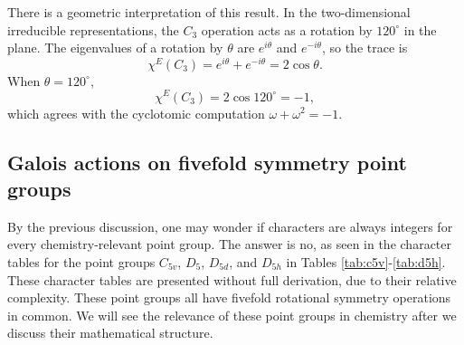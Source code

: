 \documentclass{article}
\begin{document}
    There is a geometric interpretation of this result. In the two-dimensional irreducible representations, the $C_3$ operation acts as a rotation by $120^\circ$ in the plane. The eigenvalues of a rotation by $\theta$ are $e^{i\theta}$ and $e^{-i\theta}$, so the trace is \[\chi^E(C_3)=e^{i\theta}+e^{-i\theta}=2\cos\theta.\] When $\theta=120^\circ$, \[\chi^E(C_3)=2\cos120^\circ=-1,\] which agrees with the cyclotomic computation $\omega+\omega^2=-1$.

    \pagebreak

    \subsection{Galois actions on fivefold symmetry point groups}

    By the previous discussion, one may wonder if characters are always integers for every chemistry-relevant point group. The answer is no, as seen in the character tables for the point groups $C_{5v}$, $D_5$, $D_{5d}$, and $D_{5h}$ in Tables \ref{tab:c5v}-\ref{tab:d5h}. These character tables are presented without full derivation, due to their relative complexity. These point groups all have fivefold rotational symmetry operations in common. We will see the relevance of these point groups in chemistry after we discuss their mathematical structure.
\end{document}
